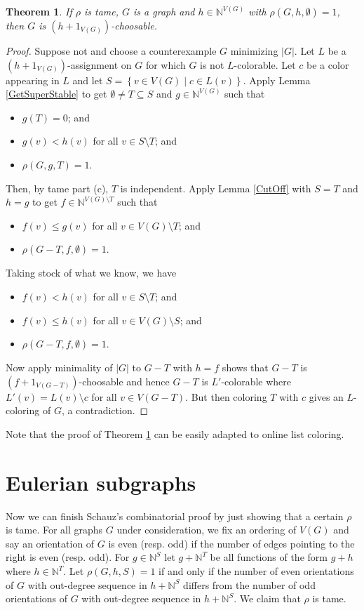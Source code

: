 \documentclass[12pt]{article}
\theoremstyle{plain}
\newtheorem{thm}{Theorem}[section]
\theoremstyle{definition}
\theoremstyle{remark}
\newcommand{\IN}{\mathbb{N}}
\newcommand{\setb}[3]{\left\{ #1 \in #2 \mid #3 \right\}}
\newcommand{\card}[1]{\left|#1\right|}
\begin{document}
\begin{thm}\label{TameRhoWins}
	If $\rho$ is tame, $G$ is a graph and $h \in \IN^{V(G)}$ with $\rho(G, h, \emptyset) = 1$, then $G$ is $(h + 1_{V(G)})$-choosable.
\end{thm}
\begin{proof}
	Suppose not and choose a counterexample $G$ minimizing $\card{G}$.  Let $L$ be a $(h + 1_{V(G)})$-assignment on $G$ for which $G$ is not $L$-colorable.  Let $c$ be a color appearing in $L$ and let $S = \setb{v}{V(G)}{c \in L(v)}$.  Apply Lemma \ref{GetSuperStable} to get $\emptyset \ne T \subseteq S$ and $g \in \IN^{V(G)}$ such that
	\begin{itemize}
		\item $g(T) = 0$; and
		\item $g(v) < h(v)$ for all $v \in S\setminus T$; and
		\item $\rho(G, g, T) = 1$.
	\end{itemize}
	Then, by tame part (c), $T$ is independent.  Apply Lemma \ref{CutOff} with $S = T$ and $h = g$ to get $f \in \IN^{V(G) \setminus T}$ such that
		\begin{itemize}
			\item $f(v) \le g(v)$ for all $v \in V(G) \setminus T$; and
			\item $\rho(G - T, f, \emptyset) = 1$.
		\end{itemize}
	Taking stock of what we know, we have
		\begin{itemize}
			\item $f(v) < h(v)$ for all $v \in S \setminus T$; and
			\item $f(v) \le h(v)$ for all $v \in V(G) \setminus S$; and
			\item $\rho(G - T, f, \emptyset) = 1$.
		\end{itemize}
		
	Now apply minimality of $|G|$ to $G-T$ with $h = f$ shows that $G-T$ is $(f + 1_{V(G-T)})$-choosable and hence $G-T$ is $L'$-colorable where $L'(v) = L(v) \setminus c$ for all $v \in V(G-T)$.  But then coloring $T$ with $c$ gives an $L$-coloring of $G$, a contradiction.
\end{proof}

Note that the proof of Theorem \ref{TameRhoWins} can be easily adapted to online list coloring.

\section{Eulerian subgraphs}
Now we can finish Schauz's combinatorial proof by just showing that a certain $\rho$ is tame.  For all graphs $G$ under consideration, we fix an ordering of $V(G)$ and say an orientation of $G$ is even (resp. odd) if the number of edges pointing to the right is even (resp. odd).  For $g \in \IN^S$ let $g + \IN^T$ be all functions of the form $g + h$ where $h \in \IN^T$. Let $\rho(G, h, S) = 1$ if and only if the number of even orientations of $G$ with out-degree sequence in $h + \IN^S$ differs from the number of odd orientations of $G$ with out-degree sequence in $h + \IN^S$.  We claim that $\rho$ is tame.  
\end{document}
